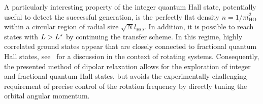 
A particularly interesting property of the integer quantum Hall state, potentially useful to detect the successful generation, is the perfectly flat density $n=1/\pi l_\text{HO}^2$ within a circular region of radial size $\sqrt{N}l_\text{HO}$.
In addition, it is possible to reach states with $L>L^{\star}$ by continuing the transfer scheme.
In this regime,
highly correlated ground states appear that are closely connected to fractional quantum Hall states, see~\cite{Osterloh2007} for a discussion in the context of rotating systems. Consequently, the presented method of dipolar relaxation allows for the exploration of integer and fractional quantum Hall states, but avoids the experimentally challenging requirement of precise control of the rotation frequency by directly tuning the orbital angular momentum.




